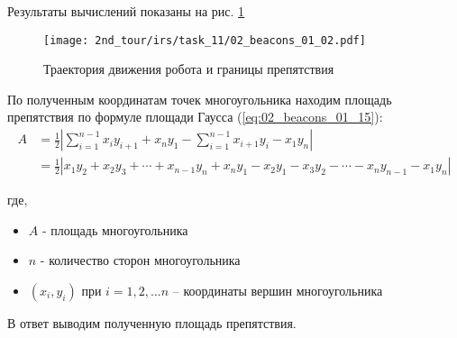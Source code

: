 Результаты вычислений показаны на рис. \ref{fig:02_beacons_01_02}

\begin{figure}[h!]
	\centering
	\texttt{[image: 2nd\_tour/irs/task\_11/02\_beacons\_01\_02.pdf]}
	\caption{Траектория движения робота и границы препятствия}
	\label{fig:02_beacons_01_02}
\end{figure}


По полученным координатам точек многоугольника находим площадь препятствия по формуле площади Гаусса (\ref{eq:02_beacons_01_15}):
\begin{equation}
	\begin{aligned}
		A & =\frac{1}{2} 
		\left|\sum_{i=1}^{n-1} x_i y_{i+1} + x_n y_1 - \sum_{i=1}^{n-1} x_{i+1} y_i -  x_1 y_n \right| \\ 
		& =
		\frac {1}{2} |x_1 y_2 + x_2 y_3 + \cdots + x_{n-1}y_n + x_n y_1 - x_2 y_1 - x_3 y_2- \cdots - x_n y_{n-1} - x_1 y_n |
	\end{aligned}
	\label{eq:02_beacons_01_15}
\end{equation}

где,
\begin{itemize}
	\item $A$ - площадь многоугольника
	\item $n$ - количество сторон многоугольника
	\item $(x_i, y_i)$ при $i = 1, 2, \dots n $ – координаты вершин многоугольника	
\end{itemize} 


В ответ выводим полученную площадь препятствия.


\codeExample

